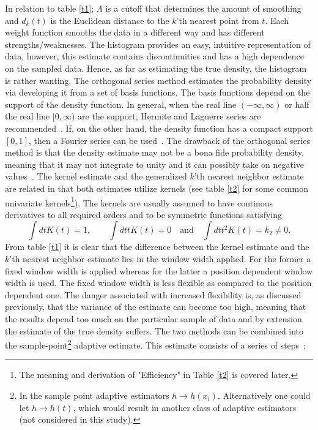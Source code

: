 \documentclass[
twoside,
openright,
titlepage,
numbers=noenddot,
headinclude,%
footinclude=true,
dottedtoc, %
ngerman,
american, %
pagesize=pdftex,
]{book}
\begin{document}
	In relation to table \ref{t1}; $\Lambda$ is a cutoff that determines the amount of smoothing and $d_k(t)$ is the Euclidean distance to the $k$'th nearest point from $t$. Each weight function smooths the data in a different way and has different strengths/weaknesses. The histogram provides an easy, intuitive representation of data, however, this estimate contains discontinuities and has a high dependence on the sampled data. Hence, as far as estimating the true density, the histogram is rather wanting. The orthogonal series method estimates the probability density via developing it from a set of basis functions. The basis functions depend on the support of the density function. In general, when the real line $(-\infty,\infty)$ or half the real line $[0,\infty)$ are the support, Hermite and Laguerre series are recommended~\citep{Efromovich}. If, on the other hand, the density function has a compact support $[0,1]$, then a Fourier series can be used~\citep{Silverman86}. The drawback of the orthogonal series method is that the density estimate may not be a bona fide probability density, meaning that it may not integrate to unity and it can possibly take on negative values~\citep{Efromovich}. The kernel estimate and the generalized $k$'th nearest neighbor estimate are related in that both estimates utilize kernels (see table \ref{t2} for some common~\citep{Silverman86} univariate kernels\footnote{The meaning and derivation of "Efficiency" in Table \ref{t2} is covered later.}). The kernels are usually assumed to have continous derivatives to all required orders and to be symmetric functions satisfying~\citep{Silverman86}
	\begin{equation}
		\int dt K(t)=1,\qquad \int dt tK(t)=0\quad \text{and}\quad \int dt t^2K(t)=k_2\neq 0.
		\label{prop}
	\end{equation}
	From table \ref{t1} it is clear that the difference between the kernel estimate and the $k$'th nearest neighbor estimate lies in the window width applied. For the former a fixed window width is applied whereas for the latter a position dependent window width is used. The fixed window width is less flexible as compared to the position dependent one. The danger associated with increased flexibility is, as discussed previously, that the variance of the estimate can become too high, meaning that the results depend too much on the particular sample of data and by extension the estimate of the true density suffers. The two methods can be combined into the sample-point\footnote{In the sample point adaptive estimators $h\rightarrow h(x_i)$. Alternatively one could let $h\rightarrow h(t)$, which would result in another class of adaptive estimators (not considered in this study).} adaptive estimate. This estimate consists of a series of steps~\citep{silverman};
\end{document}
